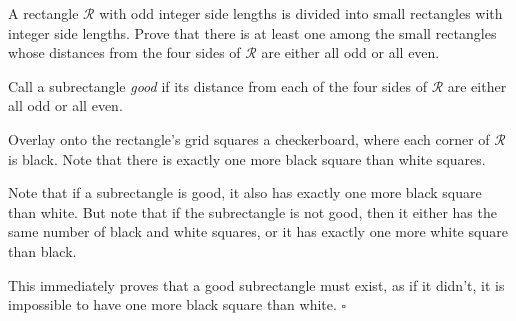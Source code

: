 
\begin{problem}[ISL 2017 C1]
    A rectangle $\mathcal{R}$ with odd integer side lengths is divided into small rectangles with integer side lengths. Prove that there is at least one among the small rectangles whose distances from the four sides of $\mathcal{R}$ are either all odd or all even.
\end{problem}

\begin{solution}
    Call a subrectangle \textit{good} if its distance from each of the four sides of $\mathcal R$ are either all odd or all even.
    
    Overlay onto the rectangle's grid squares a checkerboard, where each corner of $\mathcal R$ is black. Note that there is exactly one more black square than white squares.
    
    Note that if a subrectangle is good, it also has exactly one more black square than white. But note that if the subrectangle is not good, then it either has the same number of black and white squares, or it has exactly one more white square than black.
    
    This immediately proves that a good subrectangle must exist, as if it didn't, it is impossible to have one more black square than white. $\square$
\end{solution}
